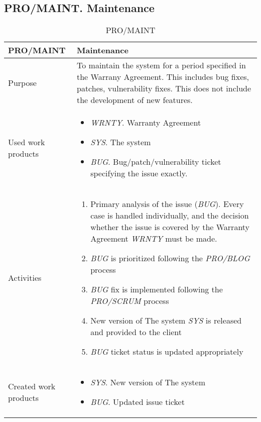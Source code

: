 \subsection{PRO/MAINT. Maintenance}
\begin{table}[h]
\begin{tabular}{l|p{}}
\hline
\textbf{PRO/MAINT}    & \textbf{Maintenance} \\ \hline
Purpose &  To maintain the system for a period specified in the Warrany Agreement. This includes bug fixes, patches, vulnerability fixes. This does not include the development of new features. \\ \hline
Used work products    &      
\begin{itemize}
    \item \textit{WRNTY}. Warranty Agreement
    \item \textit{SYS}. The system
    \item \textit{BUG}. Bug/patch/vulnerability ticket specifying the issue exactly.
\end{itemize}
\\ \hline
Activities            &   
\begin{enumerate}
    \item Primary analysis of the issue (\textit{BUG}). Every case is handled individually, and the decision whether the issue is covered by the Warranty Agreement \textit{WRNTY} must be made.
    \item \textit{BUG} is prioritized following the \textit{PRO/BLOG} process
    \item \textit{BUG} fix is implemented following the \textit{PRO/SCRUM} process
    \item New version of The system \textit{SYS} is released and provided to the client
    \item \textit{BUG} ticket status is updated appropriately
\end{enumerate}
\\ \hline
Created work products &     
\begin{itemize}
    \item \textit{SYS}. New version of The system
    \item \textit{BUG}. Updated issue ticket
\end{itemize}
\end{tabular}
\caption{PRO/MAINT}
\label{pro/MAINT}
\end{table}
\newpage

